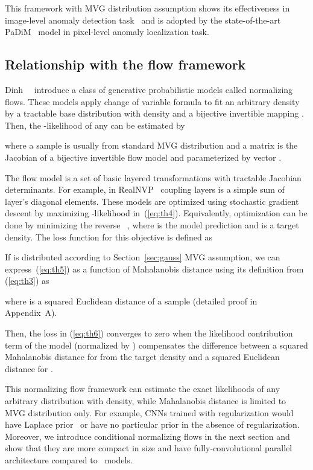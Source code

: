 \documentclass[10pt,twocolumn,letterpaper]{article}
\begin{document}
This framework with MVG distribution assumption shows its effectiveness in image-level anomaly detection task~\cite{rippel2020modeling} and is adopted by the state-of-the-art PaDiM~\cite{defard2020padim} model in pixel-level anomaly localization task.

\subsection{Relationship with the flow framework}
\label{sec:nflow}
Dinh~\etal~\cite{45819} introduce a class of generative probabilistic models called normalizing flows. These models apply change of variable formula to fit an arbitrary density  by a tractable base distribution with  density and a bijective invertible mapping . Then, the -likelihood of any  can be estimated by

where a sample  is usually from standard MVG distribution  and a matrix  is the Jacobian of a bijective invertible flow model  and  parameterized by vector .

The flow model  is a set of basic layered transformations with tractable Jacobian determinants. For example,  in RealNVP~\cite{45819} coupling layers is a simple sum of layer's diagonal elements. These models are optimized using stochastic gradient descent by maximizing -likelihood in~(\ref{eq:th4}). Equivalently, optimization can be done by minimizing the reverse ~\cite{JMLR:v22:19-1028}, where  is the model prediction and  is a target density. The loss function for this objective is defined as


If  is distributed according to Section~\ref{sec:gauss} MVG assumption, we can express~(\ref{eq:th5}) as a function of Mahalanobis distance  using its definition from (\ref{eq:th3}) as

where  is a squared Euclidean distance of a sample  (detailed proof in Appendix~A).

Then, the loss in (\ref{eq:th6}) converges to zero when the likelihood contribution term  of the model  (normalized by ) compensates the difference between a squared Mahalanobis distance for  from the target density and a squared Euclidean distance for .

This normalizing flow framework can estimate the exact likelihoods of any arbitrary distribution with  density, while Mahalanobis distance is limited to MVG distribution only. For example, CNNs trained with  regularization would have Laplace prior~\cite{GoodBengCour16} or have no particular prior in the absence of regularization. Moreover, we introduce conditional normalizing flows in the next section and show that they are more compact in size and have fully-convolutional parallel architecture compared to~\cite{cohen2021subimage, defard2020padim} models.
\end{document}
